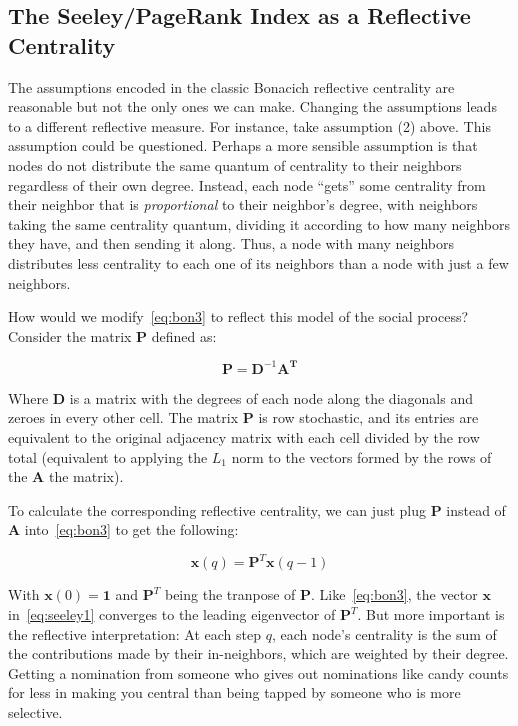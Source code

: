 \documentclass[a4paper,fleqn]{cas-sc}
\begin{document}
\subsection{The Seeley/PageRank Index as a Reflective Centrality}
The assumptions encoded in the classic Bonacich reflective centrality are reasonable but not the only ones we can make. Changing the assumptions leads to a different reflective measure. For instance, take assumption (2) above. This assumption could be questioned. Perhaps a more sensible assumption is that nodes do not distribute the same quantum of centrality to their neighbors regardless of their own degree. Instead, each node ``gets'' some centrality from their neighbor that is \textit{proportional} to their neighbor's degree, with neighbors taking the same centrality quantum, dividing it according to how many neighbors they have, and then sending it along. Thus, a node with many neighbors distributes less centrality to each one of its neighbors than a node with just a few neighbors.

How would we modify~\ref{eq:bon3} to reflect this model of the social process? Consider the matrix $\mathbf{P}$ defined as:

\begin{equation}
    \mathbf{P} = \mathbf{D}^{-1} \mathbf{A^T}
\end{equation}

Where $\mathbf{D}$ is a matrix with the degrees of each node along the diagonals and zeroes in every other cell. The matrix $\mathbf{P}$ is row stochastic, and its entries are equivalent to the original adjacency matrix with each cell divided by the row total (equivalent to applying the $L_1$ norm to the vectors formed by the rows of the $\mathbf{A}$ the matrix). 

To calculate the corresponding reflective centrality, we can just plug $\mathbf{P}$ instead of $\mathbf{A}$ into~\ref{eq:bon3} to get the following:

\begin{equation}
    \mathbf{x}(q) = \mathbf{P}^T \mathbf{x}(q - 1)
    \label{eq:seeley1}
\end{equation}

With $\mathbf{x}(0) = \mathbf{1}$ and $\mathbf{P}^T$ being the tranpose of $\mathbf{P}$. Like~\ref{eq:bon3}, the vector $\mathbf{x}$ in~\ref{eq:seeley1} converges to the leading eigenvector of $\mathbf{P}^T$. But more important is the reflective interpretation: At each step $q$, each node's centrality is the sum of the contributions made by their in-neighbors, which are weighted by their degree. Getting a nomination from someone who gives out nominations like candy counts for less in making you central than being tapped by someone who is more selective. 
\end{document}
